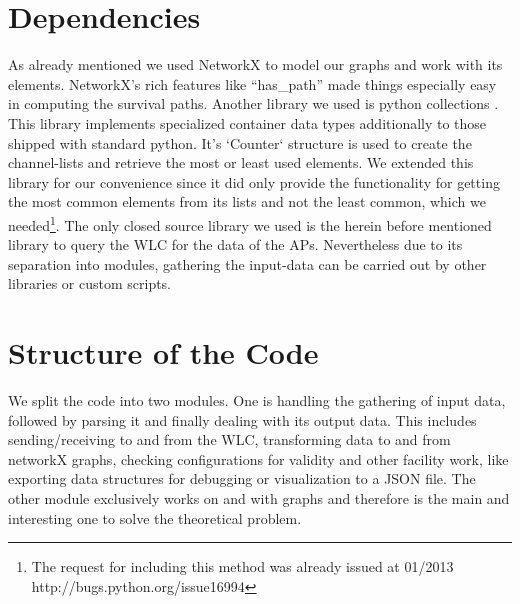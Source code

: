   \section{Dependencies}
    As already mentioned we used NetworkX\cite{hagberg-2008-exploring} to model our graphs and work with its elements.
    NetworkX's rich features like ``has\_path'' made things especially easy in computing the survival paths.
    Another library we used is python collections \cite{python_collections}.
    This library implements specialized container data types additionally to those shipped with standard python.
    It's `Counter` structure is used to create the channel-lists and retrieve the most or least used elements.
    We extended this library for our convenience since it did only provide the functionality for getting the most common elements from its lists and not the least common,
    which we needed\footnote{The request for including this method was already issued at 01/2013 http://bugs.python.org/issue16994}.
    The only closed source library we used is the herein before mentioned library to query the WLC for the data of the APs. 
    Nevertheless due to its separation into modules, gathering the input-data can be carried out by other libraries or custom scripts.
  
  \section{Structure of the Code}
    We split the code into two modules. One is handling the gathering of input data, followed by parsing it and finally dealing with its output data.
    This includes sending/receiving to and from the \ac{WLC}, transforming data to and from networkX graphs, checking configurations for validity and other facility work,
    like exporting data structures for debugging or visualization to a \ac{JSON} file.
    The other module exclusively works on and with graphs and therefore is the main and interesting one to solve the theoretical problem.
    
